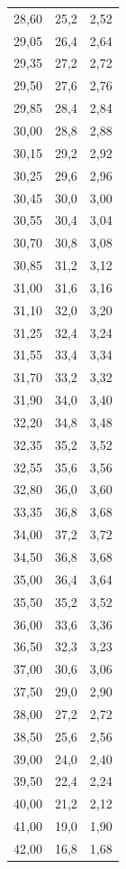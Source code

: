\documentclass{scrartcl}
\begin{document}
\begin{table}
\begin{tabular}{S S S}
        28,60 & 25,2 & 2,52\\
        29,05 & 26,4 & 2,64\\
        29,35 & 27,2 & 2,72\\
        29,50 & 27,6 & 2,76\\
        29,85 & 28,4 & 2,84\\
        30,00 & 28,8 & 2,88\\
        30,15 & 29,2 & 2,92\\
        30,25 & 29,6 & 2,96\\
        30,45 & 30,0 & 3,00\\
        30,55 & 30,4 & 3,04\\
        30,70 & 30,8 & 3,08\\
        30,85 & 31,2 & 3,12\\
        31,00 & 31,6 & 3,16\\
        31,10 & 32,0 & 3,20\\
        31,25 & 32,4 & 3,24\\
        31,55 & 33,4 & 3,34\\
        31,70 & 33,2 & 3,32\\
        31,90 & 34,0 & 3,40\\
        32,20 & 34,8 & 3,48\\
        32,35 & 35,2 & 3,52\\
        32,55 & 35,6 & 3,56\\
        32,80 & 36,0 & 3,60\\
        33,35 & 36,8 & 3,68\\
        34,00 & 37,2 & 3,72\\
        34,50 & 36,8 & 3,68\\
        35,00 & 36,4 & 3,64\\
        35,50 & 35,2 & 3,52\\
        36,00 & 33,6 & 3,36\\
        36,50 & 32,3 & 3,23\\
        37,00 & 30,6 & 3,06\\
        37,50 & 29,0 & 2,90\\
        38,00 & 27,2 & 2,72\\
        38,50 & 25,6 & 2,56\\
        39,00 & 24,0 & 2,40\\
        39,50 & 22,4 & 2,24\\
        40,00 & 21,2 & 2,12\\
        41,00 & 19,0 & 1,90\\
        42,00 & 16,8 & 1,68\\

\end{tabular}
\end{table}
\end{document}
